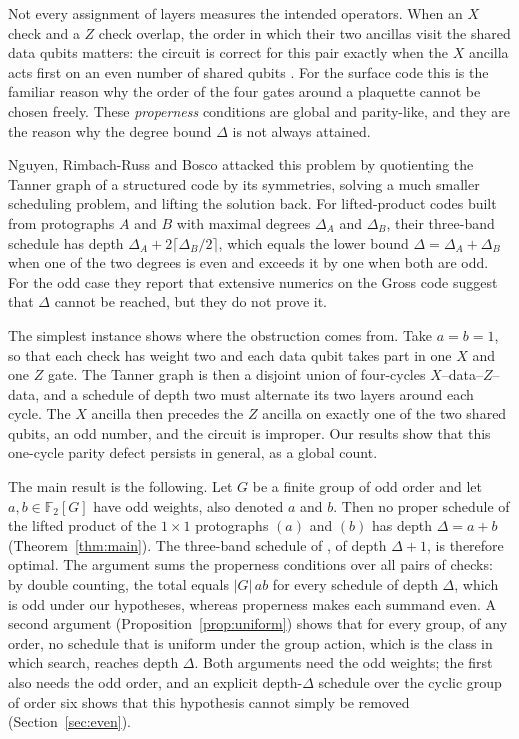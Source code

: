\documentclass[11pt,a4paper]{article}
\theoremstyle{definition}
\theoremstyle{plain}
\newcommand{\F}{\mathbb{F}_2}
\begin{document}
Not every assignment of layers measures the intended operators. When an $X$
check and a $Z$ check overlap, the order in which their two ancillas visit the
shared data qubits matters: the circuit is correct for this pair exactly when
the $X$ ancilla acts first on an even number of shared qubits
\cite{NRB2026}. For the surface code this is the familiar reason why the
order of the four gates around a plaquette cannot be chosen freely. These
\emph{properness} conditions are global and parity-like, and they are the
reason why the degree bound $\Delta$ is not always attained.

Nguyen, Rimbach-Russ and Bosco \cite{NRB2026} attacked this problem by
quotienting the Tanner graph of a structured code by its symmetries, solving
a much smaller scheduling problem, and lifting the solution back. For
lifted-product codes built from protographs $A$ and $B$ with maximal degrees
$\Delta_A$ and $\Delta_B$, their three-band schedule has depth
$\Delta_A+2\lceil\Delta_B/2\rceil$, which equals the lower bound
$\Delta=\Delta_A+\Delta_B$ when one of the two degrees is even and exceeds it
by one when both are odd. For the odd case they report that extensive
numerics on the Gross code suggest that $\Delta$ cannot be reached, but they
do not prove it.

The simplest instance shows where the obstruction comes from. Take $a=b=1$,
so that each check has weight two and each data qubit takes part in one $X$
and one $Z$ gate. The Tanner graph is then a disjoint union of four-cycles
$X$--data--$Z$--data, and a schedule of depth two must alternate its two
layers around each cycle. The $X$ ancilla then precedes the $Z$ ancilla on
exactly one of the two shared qubits, an odd number, and the circuit is
improper. Our results show that this one-cycle parity defect persists in
general, as a global count.

The main result is the following. Let $G$ be a finite group of odd order and
let $a,b\in\F[G]$ have odd weights, also denoted $a$ and $b$. Then no proper
schedule of the lifted product of the $1\times1$ protographs $(a)$ and $(b)$
has depth $\Delta=a+b$ (Theorem~\ref{thm:main}). The three-band schedule of
\cite{NRB2026}, of depth $\Delta+1$, is therefore optimal. The argument sums
the properness conditions over all pairs of checks: by double counting, the
total equals $|G|\,ab$ for every schedule of depth $\Delta$, which is odd under
our hypotheses, whereas properness makes each summand even. A second argument
(Proposition~\ref{prop:uniform}) shows that for every group, of any order,
no schedule that is uniform under the group action, which is the class in
which \cite{NRB2026} search, reaches depth $\Delta$. Both arguments need the
odd weights; the first also needs the odd order, and an explicit
depth-$\Delta$ schedule over the cyclic group of order six shows that this
hypothesis cannot simply be removed (Section~\ref{sec:even}).
\end{document}
